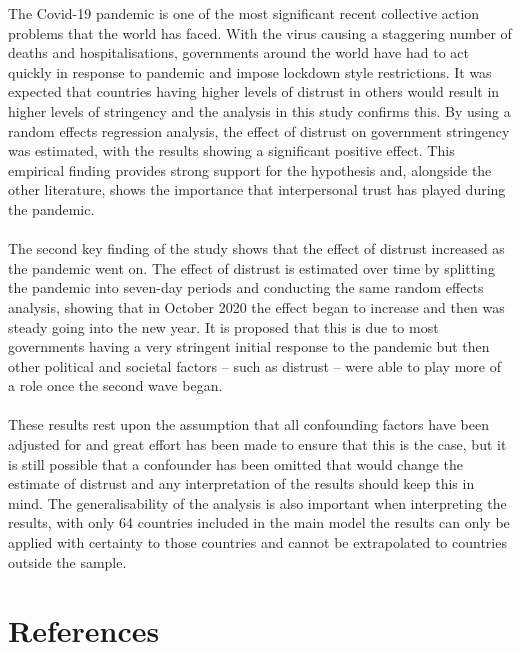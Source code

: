 \documentclass[
  11pt,
]{article}
\begin{document}
The Covid-19 pandemic is one of the most significant recent collective action problems that the world has faced. With the virus causing a staggering number of deaths and hospitalisations, governments around the world have had to act quickly in response to pandemic and impose lockdown style restrictions. It was expected that countries having higher levels of distrust in others would result in higher levels of stringency and the analysis in this study confirms this. By using a random effects regression analysis, the effect of distrust on government stringency was estimated, with the results showing a significant positive effect. This empirical finding provides strong support for the hypothesis and, alongside the other literature, shows the importance that interpersonal trust has played during the pandemic.\\
~\\
The second key finding of the study shows that the effect of distrust increased as the pandemic went on. The effect of distrust is estimated over time by splitting the pandemic into seven-day periods and conducting the same random effects analysis, showing that in October 2020 the effect began to increase and then was steady going into the new year. It is proposed that this is due to most governments having a very stringent initial response to the pandemic but then other political and societal factors -- such as distrust -- were able to play more of a role once the second wave began.\\
~\\
These results rest upon the assumption that all confounding factors have been adjusted for and great effort has been made to ensure that this is the case, but it is still possible that a confounder has been omitted that would change the estimate of distrust and any interpretation of the results should keep this in mind. The generalisability of the analysis is also important when interpreting the results, with only 64 countries included in the main model the results can only be applied with certainty to those countries and cannot be extrapolated to countries outside the sample.\\

\newpage

\hypertarget{references}{%
\section*{References}\label{references}}
\end{document}
